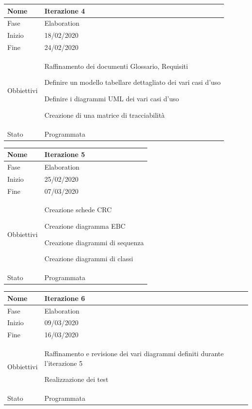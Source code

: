 \begin{center}
\begin{tabular}{ |p{2cm}|p{10cm}|  }
\hline
Nome & Iterazione 4 \\\hline
Fase & Elaboration \\\hline
Inizio & 18/02/2020 \\\hline
Fine &  24/02/2020  \\\hline
Obbiettivi & 
	\begin{compactitem}
		\item Raffinamento dei documenti Glossario, Requisiti
		\item Definire un modello tabellare dettagliato dei vari casi d'uso
		\item Definire i diagrammi UML dei vari casi d'uso
		\item Creazione di una matrice di tracciabilità
	\end{compactitem}\\\hline
Stato &  Programmata \\\hline
\end{tabular}
\label{table:4}\newline

\begin{tabular}{ |p{2cm}|p{10cm}|  }
\hline
Nome & Iterazione 5 \\\hline
Fase & Elaboration \\\hline
Inizio & 25/02/2020 \\\hline
Fine &  07/03/2020  \\\hline
Obbiettivi & 
	\begin{compactitem}
		\item Creazione schede CRC
		\item Creazione diagramma EBC
		\item Creazione diagrammi di sequenza
		\item Creazione diagrammi di classi
	\end{compactitem}\\\hline
Stato &  Programmata \\\hline
\end{tabular}
\label{table:5}\newline

\begin{tabular}{ |p{2cm}|p{10cm}|  }
\hline
Nome & Iterazione 6 \\\hline
Fase & Elaboration \\\hline
Inizio & 09/03/2020 \\\hline
Fine & 16/03/2020 \\\hline
Obbiettivi & 
	\begin{compactitem}
		\item Raffinamento e revisione dei vari diagrammi definiti durante l'iterazione 5
		\item Realizzazione dei test
	\end{compactitem}\\\hline
Stato &  Programmata \\\hline
\end{tabular}
\label{table:6}\newline


\end{center}
